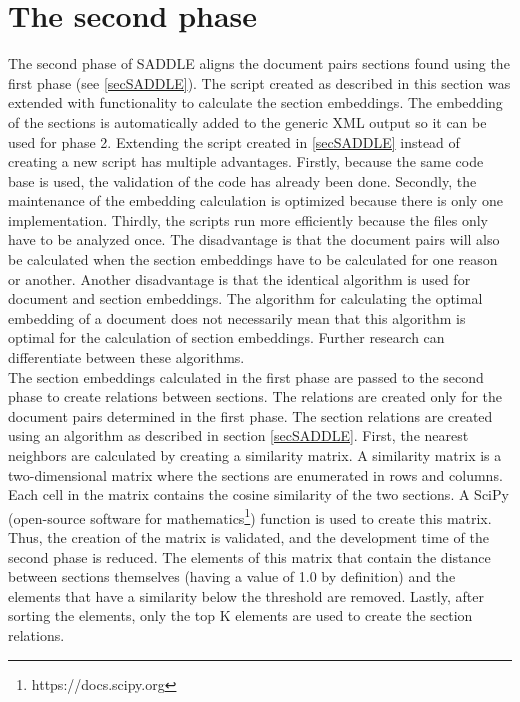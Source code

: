 \section{The second phase}
\label{phase2}
The second phase of SADDLE aligns the document pairs sections found using the first phase (see \ref{secSADDLE}). The script created as described in this section was extended with functionality to calculate the section embeddings. The embedding of the sections is automatically added to the generic XML output so it can be used for phase 2. Extending the script created in \ref{secSADDLE} instead of creating a new script has multiple advantages. Firstly, because the same code base is used, the validation of the code has already been done. Secondly, the maintenance of the embedding calculation is optimized because there is only one implementation. Thirdly, the scripts run more efficiently because the files only have to be analyzed once. The disadvantage is that the document pairs will also be calculated when the section embeddings have to be calculated for one reason or another. Another disadvantage is that the identical algorithm is used for document and section embeddings. The algorithm for calculating the optimal embedding of a document does not necessarily mean that this algorithm is optimal for the calculation of section embeddings. Further research can differentiate between these algorithms.\\

The section embeddings calculated in the first phase are passed to the second phase to create relations between sections. The relations are created only for the document pairs determined in the first phase. 
The section relations are created using an algorithm as described in section \ref{secSADDLE}. First, the nearest neighbors are calculated by creating a similarity matrix. A similarity matrix is a two-dimensional matrix where the sections are enumerated in rows and columns. Each cell in the matrix contains the cosine similarity of the two sections. A SciPy (open-source software for mathematics\footnote{https://docs.scipy.org}) function is used to create this matrix. Thus, the creation of the matrix is validated, and the development time of the second phase is reduced. The elements of this matrix that contain the distance between sections themselves (having a value of 1.0 by definition) and the elements that have a similarity below the threshold are removed. Lastly, after sorting the elements, only the top K elements are used to create the section relations.\\

